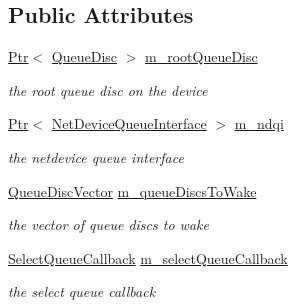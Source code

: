 \subsection*{Public Attributes}
\begin{DoxyCompactItemize}
\item 
\hyperlink{classns3_1_1Ptr}{Ptr}$<$ \hyperlink{classns3_1_1QueueDisc}{Queue\+Disc} $>$ \hyperlink{classns3_1_1TrafficControlLayer_1_1NetDeviceInfo_a55947beeb9c79fce0db934addb386d17}{m\+\_\+root\+Queue\+Disc}
\begin{DoxyCompactList}\small\item\em the root queue disc on the device \end{DoxyCompactList}\item 
\hyperlink{classns3_1_1Ptr}{Ptr}$<$ \hyperlink{classns3_1_1NetDeviceQueueInterface}{Net\+Device\+Queue\+Interface} $>$ \hyperlink{classns3_1_1TrafficControlLayer_1_1NetDeviceInfo_a44b284b4f6a66e105955f081b31b4041}{m\+\_\+ndqi}
\begin{DoxyCompactList}\small\item\em the netdevice queue interface \end{DoxyCompactList}\item 
\hyperlink{classns3_1_1TrafficControlLayer_a9c468db4727d64733d7dba66d2791edf}{Queue\+Disc\+Vector} \hyperlink{classns3_1_1TrafficControlLayer_1_1NetDeviceInfo_a7cee0ebdcb96d71fab6ec4f8721b4444}{m\+\_\+queue\+Discs\+To\+Wake}
\begin{DoxyCompactList}\small\item\em the vector of queue discs to wake \end{DoxyCompactList}\item 
\hyperlink{classns3_1_1TrafficControlLayer_aac192f903f140af92ca59a2d91a4c0cb}{Select\+Queue\+Callback} \hyperlink{classns3_1_1TrafficControlLayer_1_1NetDeviceInfo_abfebeba4a6d67327348767c4bf38a997}{m\+\_\+select\+Queue\+Callback}
\begin{DoxyCompactList}\small\item\em the select queue callback \end{DoxyCompactList}\end{DoxyCompactItemize}
